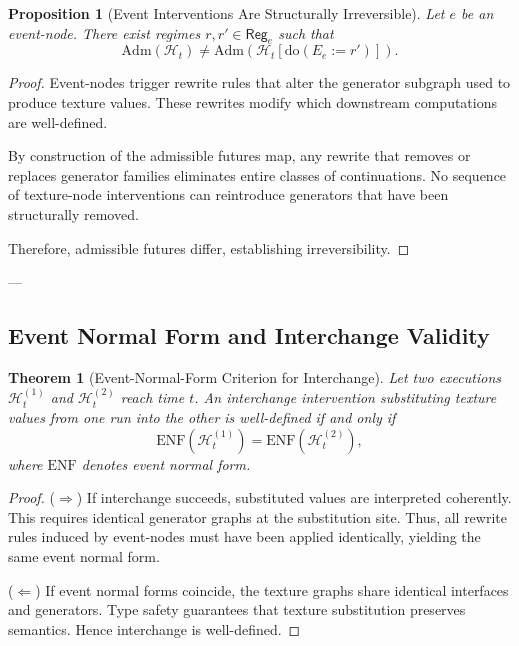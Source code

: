 \documentclass[11pt]{article}
\newtheorem{proposition}{Proposition}
\newtheorem{theorem}{Theorem}
\theoremstyle{remark}
\newcommand{\doop}{\mathrm{do}}
\newcommand{\Adm}{\mathrm{Adm}}
\newcommand{\Hist}{\mathcal{H}}
\newcommand{\Reg}{\mathsf{Reg}}
\begin{document}
\begin{proposition}[Event Interventions Are Structurally Irreversible]
Let \(e\) be an event-node. There exist regimes \(r,r' \in \Reg_e\) such that
\[
\Adm(\Hist_t) \neq \Adm(\Hist_t[\doop(E_e := r')]).
\]
\end{proposition}

\begin{proof}
Event-nodes trigger rewrite rules that alter the generator subgraph used to produce texture values.
These rewrites modify which downstream computations are well-defined.

By construction of the admissible futures map, any rewrite that removes or replaces generator families
eliminates entire classes of continuations.
No sequence of texture-node interventions can reintroduce generators that have been structurally removed.

Therefore, admissible futures differ, establishing irreversibility.
\end{proof}

---

\subsection{Event Normal Form and Interchange Validity}

\begin{theorem}[Event-Normal-Form Criterion for Interchange]
Let two executions \(\Hist_t^{(1)}\) and \(\Hist_t^{(2)}\) reach time \(t\).
An interchange intervention substituting texture values from one run into the other
is well-defined if and only if
\[
\text{ENF}(\Hist_t^{(1)}) = \text{ENF}(\Hist_t^{(2)}),
\]
where \(\text{ENF}\) denotes event normal form.
\end{theorem}

\begin{proof}
(\(\Rightarrow\))  
If interchange succeeds, substituted values are interpreted coherently.
This requires identical generator graphs at the substitution site.
Thus, all rewrite rules induced by event-nodes must have been applied identically,
yielding the same event normal form.

(\(\Leftarrow\))  
If event normal forms coincide, the texture graphs share identical interfaces and generators.
Type safety guarantees that texture substitution preserves semantics.
Hence interchange is well-defined.
\end{proof}
\end{document}
